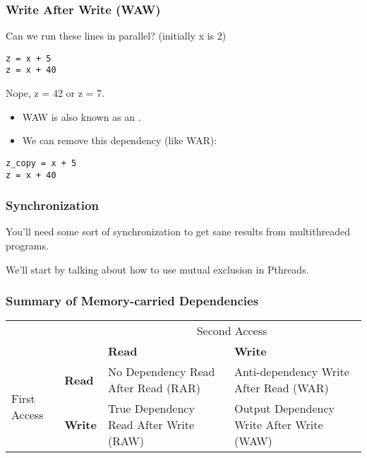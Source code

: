 \begin{frame}[fragile]
\frametitle{Write After Write (WAW)}

Can we run these lines in parallel? (initially x is 2)
\begin{lstlisting}
z = x + 5
z = x + 40
\end{lstlisting}
\pause
\alert{Nope, z = 42 or z = 7}.\\[1em]
\begin{itemize}
\item WAW is also known as an .
\item We can remove this dependency (like WAR):
\end{itemize}
\pause
\begin{lstlisting}
z_copy = x + 5
z = x + 40
\end{lstlisting}

\end{frame}


\begin{frame}
\frametitle{Synchronization}

You'll need some sort of synchronization to get sane results from
multithreaded programs. 

We'll start by talking about how to use
mutual exclusion in Pthreads.


\end{frame}

\begin{frame}
\frametitle{Summary of Memory-carried Dependencies}
\begin{center}
\begin{tabular}{ll|p{2.8cm}p{3.2cm}}
& & \multicolumn{2}{c}{Second Access} \\ 
&  & \bf Read & \bf Write \\ \hline
\multirow{2}{*}{First Access} & \bf Read & No Dependency Read After Read (RAR)  & Anti-dependency Write After Read (WAR) \\[0.5em]
& \bf Write & True Dependency Read After Write (RAW) & Output Dependency Write After Write (WAW) \\
\end{tabular}
\end{center}
\end{frame}

